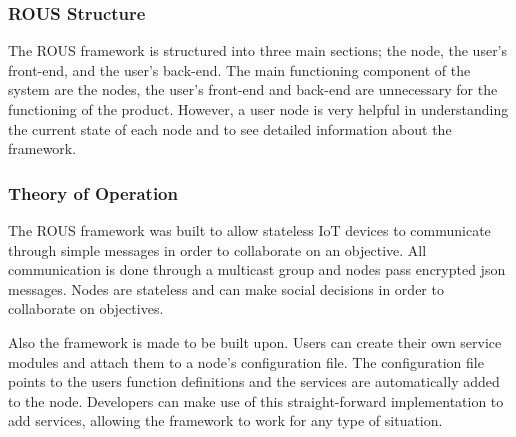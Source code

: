 \documentclass[draftclsnofoot, onecolumn, compsoc, 10pt]{IEEEtran}
\begin{document}


\subsubsection{ROUS Structure}
The ROUS framework is structured into three main sections; the node, the user's front-end, and the user's back-end. The main functioning component of the system are the nodes, the user's front-end and back-end are unnecessary for the functioning of the product. However, a user node is very helpful in understanding the current state of each node and to see detailed information about the framework. 

\subsubsection{Theory of Operation}
The ROUS framework was built to allow stateless IoT devices to communicate through simple messages in order to collaborate on an objective. All communication is done through a multicast group and nodes pass encrypted json messages. Nodes are stateless and can make social decisions in order to collaborate on objectives.

Also the framework is made to be built upon. Users can create their own service modules and attach them to a node's configuration file. The configuration file points to the users function definitions and the services are automatically added to the node. Developers can make use of this straight-forward implementation to add services, allowing the framework to work for any type of situation. 
\end{document}

